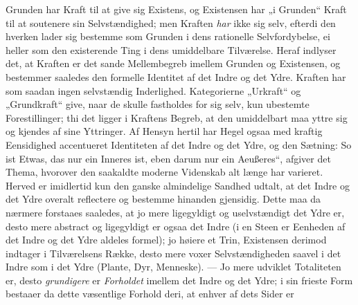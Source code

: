 \documentclass[12pt]{book}
\newcommand{\anm}[1]{\emph{\textbf{Anm.~#1.}}}
\newcommand{\opage}[1]{\marginnote{\footnotesize\textit{[#1]}}}
\begin{document}
Grunden har Kraft til at give sig Existens, og Existensen har „i Grunden“ Kraft til at soutenere
sin Selvstændighed; men Kraften \emph{har} ikke sig selv, efterdi den hverken lader sig bestemme
som Grunden i dens rationelle Selvfordybelse, ei heller som den existerende Ting i dens
umiddelbare Tilværelse. Heraf indlyser det, at Kraften er det sande Mellembegreb imellem
Grunden og Existensen, og bestemmer saaledes den formelle Identitet af det Indre og det Ydre.
Kraften har som saadan ingen selvstændig Inderlighed. Kategorierne „Urkraft“ og „Grundkraft“
give, naar de skulle fastholdes for sig selv, kun ubestemte Forestillinger; thi det ligger i
Kraftens Begreb, at den umiddelbart maa yttre sig og kjendes af sine Yttringer. Af Hensyn hertil
har Hegel ogsaa med kraftig Eensidighed accentueret Identiteten af det Indre og det Ydre, og den
Sætning: So ist Etwas, das nur ein Inneres ist, eben darum nur ein Aeußeres“, afgiver det Thema,
hvorover den saakaldte moderne Videnskab alt længe har varieret. Herved er imidlertid kun den
ganske almindelige Sandhed udtalt, at det Indre og det Ydre overalt reflectere og bestemme
hinanden gjensidig. Dette maa da nærmere forstaaes saaledes, at jo mere ligegyldigt og
uselvstændigt det Ydre er, desto mere abstract og ligegyldigt er ogsaa det Indre (i en Steen er
Eenheden af det Indre og det Ydre aldeles formel); jo høiere et Trin, Existensen derimod
indtager i Tilværelsens Række, desto mere voxer Selvstændigheden saavel i det Indre som i det
Ydre (Plante, Dyr, Menneske). --- Jo mere udviklet Totaliteten er, desto \emph{grundigere} er
\emph{Forholdet} imellem det Indre og det Ydre; i sin frieste Form bestaaer da dette væsentlige
Forhold deri, at enhver af dets Sider er
\opage{143} %
\end{document}
